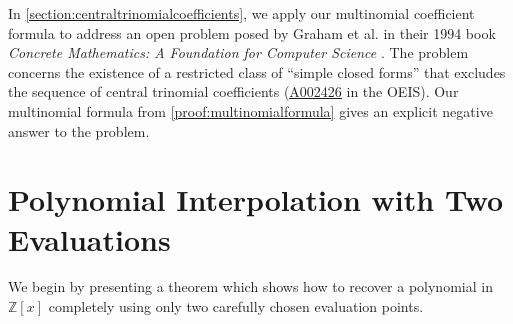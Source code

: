 \documentclass[10pt,a4paper]{article}
\theoremstyle{plain}
\newcommand{\seqnum}[1]{\href{https://oeis.org/#1}{\rm \underline{#1}}}
\begin{document}
In \cref{section:centraltrinomialcoefficients}, we apply our multinomial coefficient formula to address an open problem posed by Graham et al. in their 1994 book \textit{Concrete Mathematics: A Foundation for Computer Science} \cite{graham1994concrete}. The problem concerns the existence of a restricted class of ``simple closed forms'' that excludes the sequence of central trinomial coefficients (\seqnum{A002426} in the OEIS). Our multinomial formula from  \cref{proof:multinomialformula} gives an explicit negative answer to the problem.

\section{Polynomial Interpolation with Two Evaluations} \label{section:interpolation}
We begin by presenting a theorem which shows how to recover a polynomial in $\mathbb{Z}[x]$ completely using only two carefully chosen evaluation points.
\end{document}
